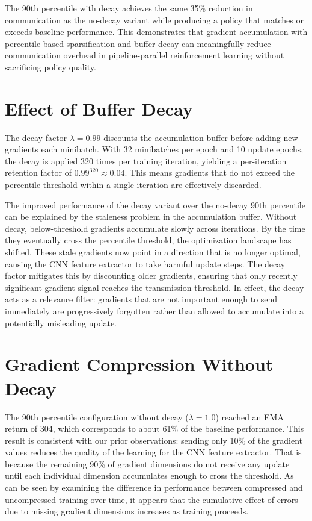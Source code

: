 The 90th percentile with decay achieves the same 35\% reduction in communication as the no-decay variant while producing a policy that matches or exceeds baseline performance. This demonstrates that gradient accumulation with percentile-based sparsification and buffer decay can meaningfully reduce communication overhead in pipeline-parallel reinforcement learning without sacrificing policy quality.

\section{Effect of Buffer Decay}

The decay factor $\lambda = 0.99$ discounts the accumulation buffer before adding new gradients each minibatch. With 32 minibatches per epoch and 10 update epochs, the decay is applied 320 times per training iteration, yielding a per-iteration retention factor of $0.99^{320} \approx 0.04$. This means gradients that do not exceed the percentile threshold within a single iteration are effectively discarded.

The improved performance of the decay variant over the no-decay 90th percentile can be explained by the staleness problem in the accumulation buffer. Without decay, below-threshold gradients accumulate slowly across iterations. By the time they eventually cross the percentile threshold, the optimization landscape has shifted. These stale gradients now point in a direction that is no longer optimal, causing the CNN feature extractor to take harmful update steps. The decay factor mitigates this by discounting older gradients, ensuring that only recently significant gradient signal reaches the transmission threshold. In effect, the decay acts as a relevance filter: gradients that are not important enough to send immediately are progressively forgotten rather than allowed to accumulate into a potentially misleading update.

\section{Gradient Compression Without Decay}

The 90th percentile configuration without decay ($\lambda = 1.0$) reached an EMA return of 304, which corresponds to about 61\% of the baseline performance. This result is consistent with our prior observations: sending only 10\% of the gradient values reduces the quality of the learning for the CNN feature extractor. That is because the remaining 90\% of gradient dimensions do not receive any update until each individual dimension accumulates enough to cross the threshold. As can be seen by examining the difference in performance between compressed and uncompressed training over time, it appears that the cumulative effect of errors due to missing gradient dimensions increases as training proceeds.

